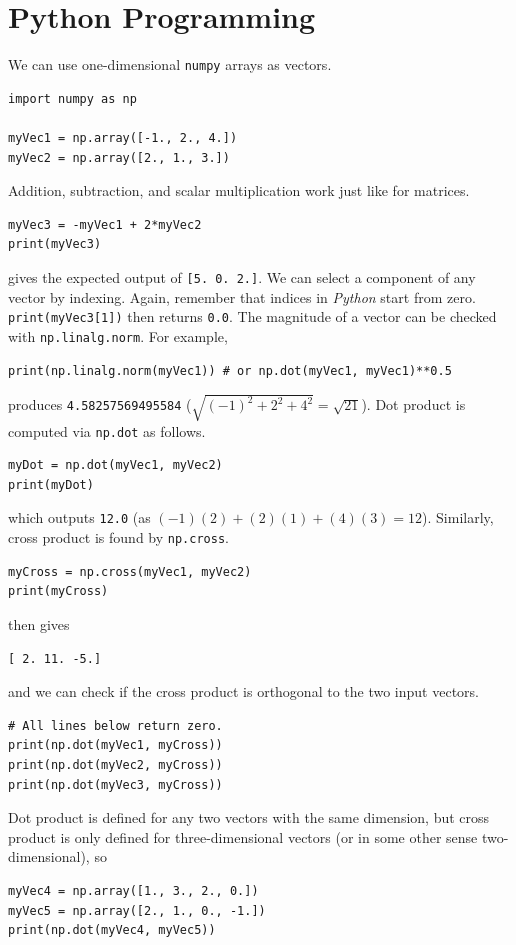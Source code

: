 \section{Python Programming}
\label{section:ch4python}
We can use one-dimensional \verb|numpy| arrays as vectors. 
\begin{lstlisting}
import numpy as np

myVec1 = np.array([-1., 2., 4.])
myVec2 = np.array([2., 1., 3.])
\end{lstlisting}
Addition, subtraction, and scalar multiplication work just like for matrices.
\begin{lstlisting}
myVec3 = -myVec1 + 2*myVec2
print(myVec3)
\end{lstlisting}
gives the expected output of \verb|[5. 0. 2.]|. We can select a component of any vector by indexing. Again, remember that indices in \textit{Python} start from zero. \verb|print(myVec3[1])| then returns \verb|0.0|. The magnitude of a vector can be checked with \verb|np.linalg.norm|. For example,
\begin{lstlisting}
print(np.linalg.norm(myVec1)) # or np.dot(myVec1, myVec1)**0.5
\end{lstlisting}
produces \verb|4.58257569495584| ($\sqrt{(-1)^2 + 2^2 + 4^2} = \sqrt{21}$). Dot product is computed via \verb|np.dot| as follows.
\begin{lstlisting}
myDot = np.dot(myVec1, myVec2)
print(myDot)
\end{lstlisting}
which outputs \verb|12.0| (as $(-1)(2) + (2)(1) + (4)(3) = 12$). Similarly, cross product is found by \verb|np.cross|.
\begin{lstlisting}
myCross = np.cross(myVec1, myVec2)
print(myCross)
\end{lstlisting}
then gives
\begin{lstlisting}
[ 2. 11. -5.]   
\end{lstlisting}
and we can check if the cross product is orthogonal to the two input vectors.
\begin{lstlisting}
# All lines below return zero.
print(np.dot(myVec1, myCross))
print(np.dot(myVec2, myCross))
print(np.dot(myVec3, myCross))
\end{lstlisting}
Dot product is defined for any two vectors with the same dimension, but cross product is only defined for three-dimensional vectors (or in some other sense two-dimensional), so
\begin{lstlisting}
myVec4 = np.array([1., 3., 2., 0.])
myVec5 = np.array([2., 1., 0., -1.])
print(np.dot(myVec4, myVec5))
\end{lstlisting}
